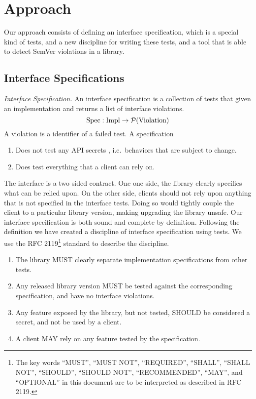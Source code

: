 \section{Approach}

Our approach consists of defining an interface specification, which is a
special kind of tests, and a new discipline for writing these tests, and a tool
that is able to detect SemVer violations in a library.

\subsection{Interface Specifications}

\begin{definition}\textit{Interface Specification.}
An interface specification is a collection of tests that given an
implementation and returns a list of interface violations. 
$$\text{Spec} : \text{Impl} \to \mathcal{P}(\text{Violation})$$
A violation is a identifier of a failed test. A specification
\begin{enumerate}
\item Does not test any API secrets \cite{Parnas}, i.e.\ behaviors
  that are subject to change.
    \item Does test everything that a client can rely on.  
\end{enumerate}
\end{definition}

The interface is a two sided contract. One one side, the library
clearly specifies what can be relied upon. On the other side, clients
should not rely upon anything that is not specified in the interface
tests.  Doing so would tightly couple the client to a particular
library version, making upgrading the library unsafe. Our interface
specification is both sound and complete by definition.  Following the
definition we have created a discipline of interface specification
using tests. We use the RFC 2119\footnote{The key words ``MUST'',
  ``MUST NOT'', ``REQUIRED'', ``SHALL'', ``SHALL NOT'', ``SHOULD'',
  ``SHOULD NOT'', ``RECOMMENDED'', ``MAY'', and ``OPTIONAL'' in this
  document are to be interpreted as described in RFC
  2119\cite{rfc2119}.} standard to describe the discipline.

\begin{enumerate}
    \item The library MUST clearly separate implementation specifications from
    other tests.
    \item Any released library version MUST be tested against the corresponding
    specification, and have no interface violations.
    \item Any feature exposed by the library, but not tested, SHOULD be
    considered a secret, and not be used by a client.
    \item A client MAY rely on any feature tested by the specification.
\end{enumerate}

